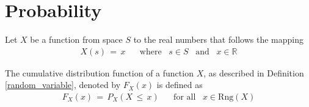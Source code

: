 \section{Probability}

\begin{definition}
Let $X$ be a function from space $S$ to the real numbers that follows the mapping
\begin{align*}
    X(s) \hspace{2pt} = \hspace{2pt} x \hspace{20pt} \text{where} \hspace{10pt} s \in S \hspace{10pt} \text{and} \hspace{10pt} x \in \mathbb{R}
\end{align*}
\label{random_variable}
\end{definition}

\begin{definition}
The cumulative distribution function of a function $X$, as described in Definition \ref{random_variable}, denoted by $F_{X}(x)$ is defined as
\begin{align*}
    F_{X}(x) \hspace{2pt} = \hspace{2pt} P_{X}(X \hspace{2pt} \leq \hspace{2pt} x) \hspace{20pt} \text{for all} \hspace{10pt} x \in \text{Rng}(X)
\end{align*}
\label{cumulative_distribution_function}
\end{definition}

